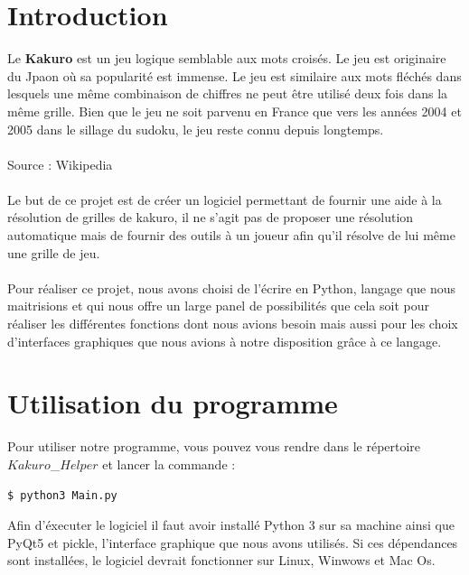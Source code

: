 \documentclass[12pt]{article}
\begin{document}
\tableofcontents
\newpage


\section{Introduction}
Le \textbf{Kakuro} est un jeu logique semblable aux mots croisés. Le jeu est originaire du Jpaon où sa popularité est immense. Le jeu est similaire aux mots fléchés dans lesquels une même combinaison de chiffres ne peut être utilisé deux fois dans la même grille. Bien que le jeu ne soit parvenu en France que vers les années 2004 et 2005 dans le sillage du sudoku, le jeu reste connu depuis longtemps. \\ \\ Source : Wikipedia \\ \\
Le but de ce projet est de créer un logiciel permettant de fournir une aide à la résolution de grilles de kakuro, il ne s'agit pas de proposer une résolution automatique mais de fournir des outils à un joueur afin qu'il résolve de lui même une grille de jeu. \\\ \\
Pour réaliser ce projet, nous avons choisi de l'écrire en Python, langage que nous maitrisions et qui nous offre un large panel de possibilités que cela soit pour réaliser les différentes fonctions dont nous avions besoin mais aussi pour les choix d'interfaces graphiques que nous avions à notre disposition grâce à ce langage. 
\section{Utilisation du programme}
Pour utiliser notre programme, vous pouvez vous rendre dans le répertoire $Kakuro$\_$Helper$ et lancer la commande :
\begin{lstlisting}[language=bash]
  $ python3 Main.py
\end{lstlisting}
Afin d'éxecuter le logiciel il faut avoir installé Python 3 sur sa machine ainsi que PyQt5 et pickle, l'interface graphique que nous avons utilisés. Si ces dépendances sont installées, le logiciel devrait fonctionner sur Linux, Winwows et Mac Os.

\newpage
\end{document}
